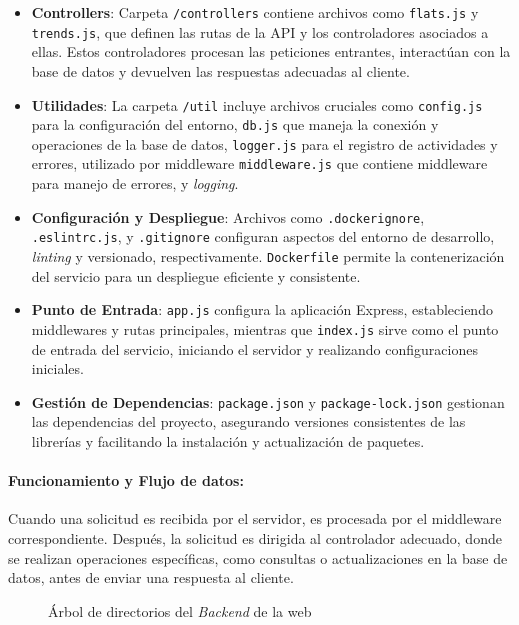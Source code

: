 \begin{itemize}
    \item \textbf{Controllers}: Carpeta \texttt{/controllers} contiene archivos como \texttt{flats.js} y \texttt{trends.js}, que definen las rutas de la API y los controladores asociados a ellas. Estos controladores procesan las peticiones entrantes, interactúan con la base de datos y devuelven las respuestas adecuadas al cliente.
    \item \textbf{Utilidades}: La carpeta \texttt{/util} incluye archivos cruciales como \texttt{config.js} para la configuración del entorno, \texttt{db.js} que maneja la conexión y operaciones de la base de datos, \texttt{logger.js} para el registro de actividades y errores, utilizado por middleware
    \texttt{middleware.js} que contiene middleware para manejo de errores, y \textit{logging}.
    \item \textbf{Configuración y Despliegue}: Archivos como \texttt{.dockerignore}, \texttt{.eslintrc.js}, y \texttt{.gitignore} configuran aspectos del entorno de desarrollo, \textit{linting} y versionado, respectivamente. \texttt{Dockerfile} permite la contenerización del servicio para un despliegue eficiente y consistente. 
    \item \textbf{Punto de Entrada}: \texttt{app.js} configura la aplicación Express, estableciendo middlewares y rutas principales, mientras que \texttt{index.js} sirve como el punto de entrada del servicio, iniciando el servidor y realizando configuraciones iniciales.
    \item \textbf{Gestión de Dependencias}: \texttt{package.json} y \texttt{package-lock.json} gestionan las dependencias del proyecto, asegurando versiones consistentes de las librerías y facilitando la instalación y actualización de paquetes.
\end{itemize}

\paragraph{Funcionamiento y Flujo de datos: }
Cuando una solicitud es recibida por el servidor, es procesada por el middleware correspondiente. Después, la solicitud es dirigida al controlador adecuado, donde se realizan operaciones específicas, como consultas o actualizaciones en la base de datos, antes de enviar una respuesta al cliente.

\begin{figure}
    \caption{Árbol de directorios del \textit{Backend} de la web}
    \label{fig:dirtree_backend}
\end{figure}


